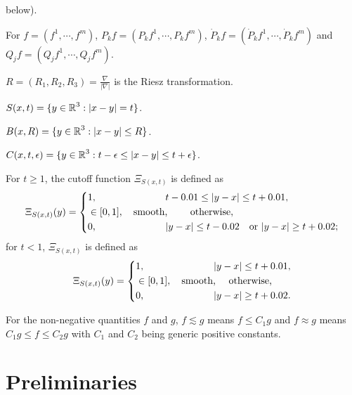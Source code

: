 \documentclass[11pt,twoside]{article}
\def\R{\mathop{\mathbb R\kern 0pt}\nolimits}
\def\ds{\displaystyle}
\def\f{\frac}
\def\eps{\epsilon}
\def\ls{\lesssim}
\newcommand{\pk}{\dot{P}_k}
\theoremstyle{plain}
\theoremstyle{definition}
\numberwithin{equation}{section}
\begin{document}
\begin{description}
below).
	\item [$\blacktriangleright $]For $f = (f^1,\cdots,f^m)$, $P_k f = (P_k f^1,\cdots,P_k f^m)$, $\pk f = (\pk f^1,\cdots,\pk f^m)$ and $Q_j f = (Q_j f^1,\cdots,Q_j f^m)$.
	\item [$\blacktriangleright $]$R=(R_1,R_2,R_3)=\ds\f{\nabla}{|\nabla|}$ is the Riesz transformation.
	\item [$\blacktriangleright $]$S(x,t) = \{y\in \R^3: |x-y|=t\}$.
	\item [$\blacktriangleright $]$B(x,R) = \{y\in \R^3: |x-y|\le R\} $.
	\item [$\blacktriangleright $] $C(x,t,\eps) = \{y\in \R^3: t-\eps\le|x-y|\le t+\eps\}$.
	\item [$\blacktriangleright $] For $t\ge 1$, the cutoff function $\Xi_{S(x,t)}$ is defined as
	\begin{equation*}
		\Xi_{S(x,t)} (y) = 	\left\{
		\begin{aligned}
			&1,\quad\quad\quad\quad\quad\quad\quad t-0.01\le|y-x|\le t+0.01,\\
			&\in[0,1], \quad\text{smooth, \qquad otherwise},\\
			&0,\quad\quad\quad\quad\quad\quad\quad |y-x|\le t-0.02\quad\text{or}\ |y-x|\ge t+0.02;
		\end{aligned}
		\right.
	\end{equation*}
for $t<1$, $\Xi_{S(x,t)}$ is defined as
	\begin{equation*}
		\Xi_{S(x,t)} (y) = 	\left\{
		\begin{aligned}
			&1,\quad\quad\quad\quad\quad\quad\quad |y-x|\le t+0.01,\\
			&\in[0,1],\quad\text{smooth, \quad otherwise,}\\
			&0,\quad\quad\quad\quad\quad\quad\quad |y-x|\ge t+0.02.
		\end{aligned}
		\right.
	\end{equation*}
\item [$\blacktriangleright $] For the non-negative quantities $f$ and $g$,
	$f\ls g$ means $f\le C_1g$ and $f\approx g$ means $C_1g\le f\le C_2g$ with $C_1$ and $C_2$ being generic positive constants.
\end{description}

\section{Preliminaries}\label{Section 2}
\end{document}
